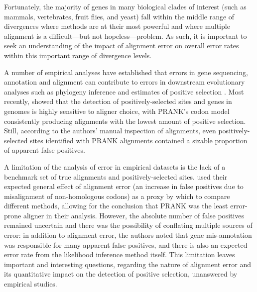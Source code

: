 Fortunately, the majority of genes in many biological clades of
interest (such as mammals, vertebrates, fruit flies, and yeast) fall
within the middle range of divergences where \sw methods are at their
most powerful and where multiple alignment is a difficult---but not
hopeless---problem. As such, it is important to seek an understanding
of the impact of alignment error on overall error rates within this
important range of divergence levels.

A number of empirical analyses have established that errors in gene
sequencing, annotation and alignment can contribute to errors in
downstream evolutionary analyses such as phylogeny inference
\citep{Wong2008Alignment} and estimates of positive selection
\citep{Schneider2009,MarkovaRaina2011}. Most recently,
\citet{MarkovaRaina2011} showed
that the detection of positively-selected sites and genes in \Dr
genomes is highly sensitive to aligner choice, with PRANK's codon
model \citep{Loytynoja2008PhylogenyAware} consistently producing
alignments with the lowest amount of positive selection. Still,
according to the authors' manual inspection of alignments, even
positively-selected sites identified with PRANK alignments contained a
sizable proportion of apparent false positives.

A limitation of the analysis of error in empirical datasets is the
lack of a benchmark set of true alignments and positively-selected
sites. \citet{MarkovaRaina2011} used their expected general effect of
alignment error (an increase in false positives due to misalignment of
non-homologous codons) as a proxy by which to compare different
methods, allowing for the conclusion that PRANK was the least
error-prone aligner in their analysis. However, the absolute number of
false positives remained uncertain and there was the possibility of
conflating multiple sources of error: in addition to alignment error,
the authors noted that gene mis-annotation was responsible for many
apparent false positives, and there is also an expected error rate
from the likelihood inference method itself. This limitation leaves
important and interesting questions, regarding the nature of alignment
error and its quantitative impact on the detection of positive
selection, unanswered by empirical studies.

